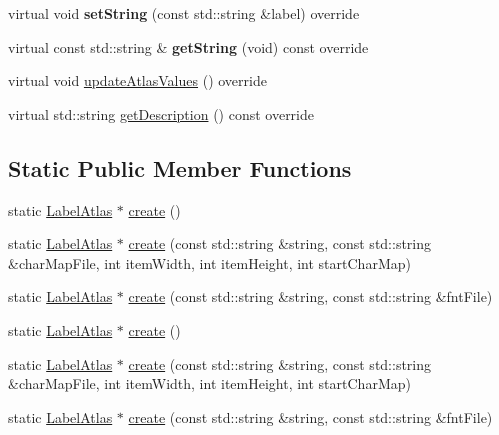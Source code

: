\begin{DoxyCompactItemize}
\mbox{\label{classLabelAtlas_a1d9a7c4ef6bf8e3099a4e7f320c891ac}} 
virtual void {\bfseries set\+String} (const std\+::string \&label) override
\item 
\mbox{\label{classLabelAtlas_aba6cd4c095f9d4634b7de40440a38893}} 
virtual const std\+::string \& {\bfseries get\+String} (void) const override
\item 
virtual void \hyperlink{classLabelAtlas_a0075a4071c6da704b665bca30393ac5b}{update\+Atlas\+Values} () override
\item 
virtual std\+::string \hyperlink{classLabelAtlas_a31869bda92ecc664002ebd96b979d099}{get\+Description} () const override
\end{DoxyCompactItemize}
\subsection*{Static Public Member Functions}
\begin{DoxyCompactItemize}
\item 
static \hyperlink{classLabelAtlas}{Label\+Atlas} $\ast$ \hyperlink{classLabelAtlas_a429e8c4158fef988031fd9e45e759268}{create} ()
\item 
static \hyperlink{classLabelAtlas}{Label\+Atlas} $\ast$ \hyperlink{classLabelAtlas_a0e07b68919ed3b5c4fb7f585d0d9e0eb}{create} (const std\+::string \&string, const std\+::string \&char\+Map\+File, int item\+Width, int item\+Height, int start\+Char\+Map)
\item 
static \hyperlink{classLabelAtlas}{Label\+Atlas} $\ast$ \hyperlink{classLabelAtlas_a082db7324aa50be920b7d014a8b1c1ef}{create} (const std\+::string \&string, const std\+::string \&fnt\+File)
\item 
static \hyperlink{classLabelAtlas}{Label\+Atlas} $\ast$ \hyperlink{classLabelAtlas_af818d41292b936db1441d172b5d8cf35}{create} ()
\item 
static \hyperlink{classLabelAtlas}{Label\+Atlas} $\ast$ \hyperlink{classLabelAtlas_a064e5f1e4e1183a64af95ee78ae1c3c0}{create} (const std\+::string \&string, const std\+::string \&char\+Map\+File, int item\+Width, int item\+Height, int start\+Char\+Map)
\item 
static \hyperlink{classLabelAtlas}{Label\+Atlas} $\ast$ \hyperlink{classLabelAtlas_ae5538d5f76f507618714b681c4d90caa}{create} (const std\+::string \&string, const std\+::string \&fnt\+File)
\end{DoxyCompactItemize}

